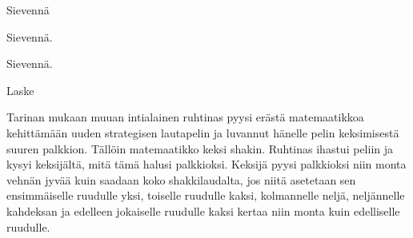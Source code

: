 \begin{tehtavasivu}
\begin{tehtava}
        Sievennä
        \begin{vastaus}
        \end{vastaus}
    \end{tehtava}

        \begin{tehtava}
     Sievennä.
        \begin{vastaus}
        \end{vastaus}
    \end{tehtava}
    
        \begin{tehtava}
        Sievennä.
        \begin{vastaus}
        \end{vastaus}
    \end{tehtava}

\begin{tehtava}
	Laske
	
	\begin{vastaus}
	\end{vastaus}
\end{tehtava}


\begin{tehtava}
Tarinan mukaan muuan intialainen ruhtinas pyysi erästä matemaatikkoa kehittämään uuden strategisen lautapelin ja luvannut hänelle pelin keksimisestä suuren palkkion. Tällöin matemaatikko keksi shakin. Ruhtinas ihastui peliin ja kysyi keksijältä, mitä tämä halusi palkkioksi. Keksijä pyysi palkkioksi niin monta vehnän jyvää kuin saadaan koko shakkilaudalta, jos niitä asetetaan sen ensimmäiselle ruudulle yksi, toiselle ruudulle kaksi, kolmannelle neljä, neljännelle kahdeksan ja edelleen jokaiselle ruudulle kaksi kertaa niin monta kuin edelliselle ruudulle.
	

\end{tehtava}
\end{tehtavasivu}
